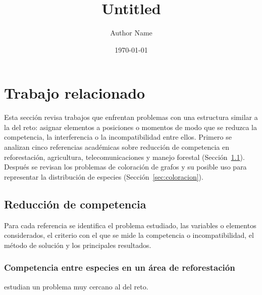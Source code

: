 \documentclass[11pt]{article}
\title{Untitled}
\author{Author Name}
\date{\today}
\begin{document}
\section{Trabajo relacionado}
\label{sec:trabajo-relacionado}

Esta sección revisa trabajos que enfrentan problemas con una estructura similar a la del reto: asignar elementos a posiciones o momentos de modo que se reduzca la competencia, la interferencia o la incompatibilidad entre ellos. Primero se analizan cinco referencias académicas sobre reducción de competencia en reforestación, agricultura, telecomunicaciones y manejo forestal (Sección~\ref{sec:reduccion-competencia}). Después se revisan los problemas de coloración de grafos y su posible uso para representar la distribución de especies (Sección~\ref{sec:coloracion}).

\subsection{Reducción de competencia}
\label{sec:reduccion-competencia}

Para cada referencia se identifica el problema estudiado, las variables o elementos considerados, el criterio con el que se mide la competencia o incompatibilidad, el método de solución y los principales resultados.

\subsubsection{Competencia entre especies en un área de reforestación}

\textcite{elizalde2025} estudian un problema muy cercano al del reto.
\end{document}
